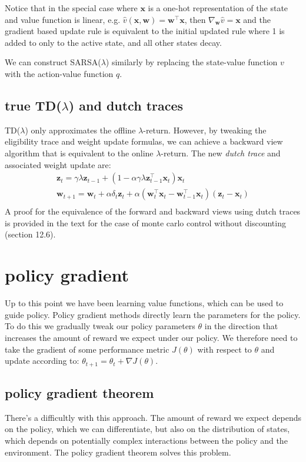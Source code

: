 Notice that in the special case where $\mathbf{x}$ is a one-hot representation of the state and value function is linear, e.g. $\hat{v}(\mathbf{x}, \mathbf{w}) = \mathbf{w}^\top \mathbf{x}$, then $\nabla_\mathbf{w} \hat{v} = \mathbf{x}$ and the gradient based update rule is equivalent to the initial updated rule where 1 is added to only to the active state, and all other states decay.

We can construct SARSA($\lambda$) similarly by replacing the state-value function $v$ with the action-value function $q$.

\subsection{true TD($\lambda$) and dutch traces}
TD($\lambda$) only approximates the offline $\lambda$-return. However, by tweaking the eligibility trace and weight update formulas, we can achieve a backward view algorithm that is equivalent to the online $\lambda$-return. The new \textit{dutch trace} and associated weight update are:
\begin{gather*}
\mathbf{z}_{t} = \gamma \lambda \mathbf{z}_{t-1} + (1 - \alpha \gamma \lambda\mathbf{z}_{t-1}^\top \mathbf{x}_{t})\mathbf{x}_{t} \\
\mathbf{w}_{t+1} = \mathbf{w}_{t} + \alpha \delta_t \mathbf{z}_{t} + \alpha (\mathbf{w}_{t}^\top\mathbf{x}_{t} - \mathbf{w}_{t-1}^\top\mathbf{x}_{t}) (\mathbf{z}_{t} - \mathbf{x}_{t})\\
\end{gather*}
A proof for the equivalence of the forward and backward views using dutch traces is provided in the text for the case of monte carlo control without discounting (section 12.6).

\section{policy gradient}
Up to this point we have been learning value functions, which can be used to guide policy. Policy gradient methods directly learn the parameters for the policy. To do this we gradually tweak our policy parameters $\theta$ in the direction that increases the amount of reward we expect under our policy. We therefore need to take the gradient of some performance metric $J(\theta)$ with respect to $\theta$ and update according to: $\theta_{t+1} = \theta_t + \nabla J(\theta)$.

\subsection{policy gradient theorem}
There's a difficultly with this approach. The amount of reward we expect depends on the policy, which we can differentiate, but also on the distribution of states, which depends on potentially complex interactions between the policy and the environment. The policy gradient theorem solves this problem.

